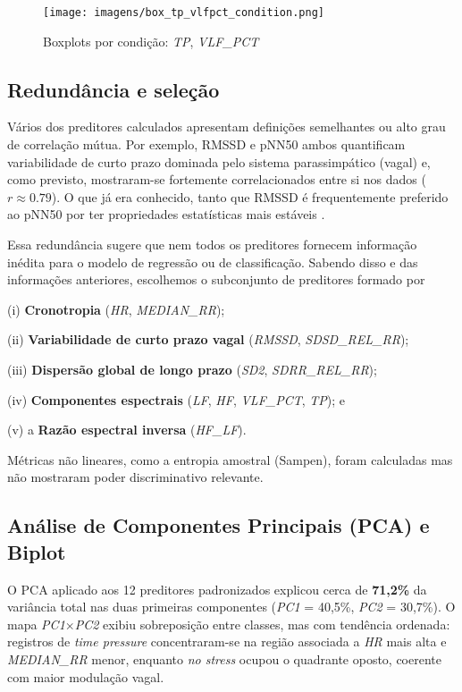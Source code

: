 \documentclass[conference]{IEEEtran}
\begin{document}
\begin{figure}[H]
    \centering
    \texttt{[image: imagens/box\_tp\_vlfpct\_condition.png]}
    \caption{Boxplots por condição: \textit{TP}, \textit{VLF\_PCT}}
    \label{fig:BXP_TP_VLFPCT}
\end{figure}


\subsection{Redundância e seleção}

Vários dos preditores calculados apresentam definições semelhantes ou alto grau de correlação mútua. Por exemplo, RMSSD e pNN50 ambos quantificam variabilidade de curto prazo dominada pelo sistema parassimpático (vagal) e, como previsto, mostraram-se fortemente correlacionados entre si nos dados ($r \approx 0.79$). O que já era conhecido, tanto que RMSSD é frequentemente preferido ao pNN50 por ter propriedades estatísticas mais estáveis \cite{R3}. 

Essa redundância sugere que nem todos os preditores fornecem informação inédita para o modelo de regressão ou de classificação. Sabendo disso e das informações anteriores, escolhemos o subconjunto de preditores formado por 

(i) \textbf{Cronotropia} (\textit{HR}, \textit{MEDIAN\_RR}); 

(ii) \textbf{Variabilidade de curto prazo vagal} (\textit{RMSSD}, \textit{SDSD\_REL\_RR}); 

(iii) \textbf{Dispersão global de longo prazo} (\textit{SD2}, \textit{SDRR\_REL\_RR}); 

(iv) \textbf{Componentes espectrais} (\textit{LF}, \textit{HF}, \textit{VLF\_PCT}, \textit{TP}); e 

(v) a \textbf{Razão espectral inversa} (\textit{HF\_LF}).

Métricas não lineares, como a entropia amostral (Sampen), foram calculadas mas não mostraram poder discriminativo relevante.

\subsection{Análise de Componentes Principais (PCA) e Biplot}
O PCA aplicado aos 12 preditores padronizados explicou cerca de \textbf{71,2\%} da variância total nas duas primeiras componentes (\textit{PC1} = 40,5\%, \textit{PC2} = 30,7\%). 
O mapa \textit{PC1}$\times$\textit{PC2} exibiu sobreposição entre classes, mas com tendência ordenada: registros de \textit{time pressure} concentraram-se na região associada a \textit{HR} mais alta e \textit{MEDIAN\_RR} menor, enquanto \textit{no stress} ocupou o quadrante oposto, coerente com maior modulação vagal. 
\end{document}
